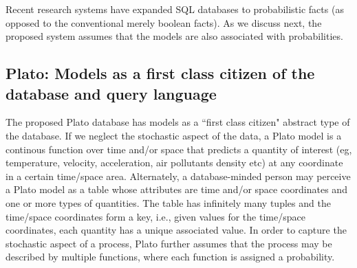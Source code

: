 Recent research systems have expanded SQL databases to probabilistic facts (as opposed to the conventional merely boolean facts). As we discuss next, the proposed system assumes that the models are also associated with probabilities.


\subsection{Plato: Models as a first class citizen of the database and query language}
\label{sec:plato}
The proposed Plato database has models as a ``first class citizen" abstract type of the database. If we neglect the stochastic aspect of the data, a Plato model is a continous function over time and/or space that predicts a quantity of interest (eg, temperature, velocity, acceleration, air pollutants density etc) at any coordinate in a certain time/space area. Alternately, a database-minded person may perceive a Plato model as a table whose attributes are time and/or space coordinates and one or more types of quantities. The table has infinitely many tuples and the time/space coordinates form a key, i.e.,  given values for the time/space coordinates, each quantity has a unique associated value. 
In order to capture the stochastic aspect of a process, Plato further assumes that the process may be described by multiple functions, where each function is assigned a probability.


